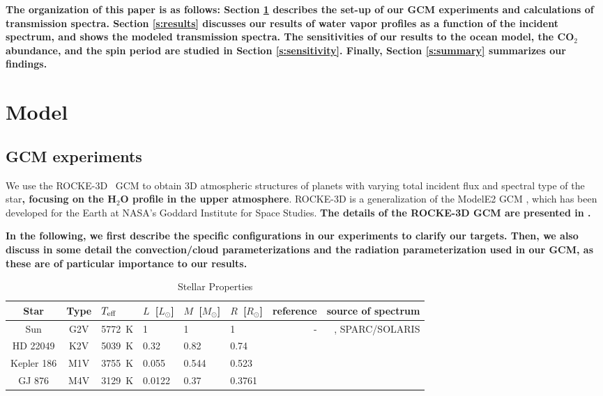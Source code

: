 \documentclass[11pt,numberedappendix,twocolappendix,]{emulateapj}
\def\water{H$_2$O}
\def\modelE{ROCKE-3D}
\def\wv{water vapor}
\def\revise#1{{\bf #1}}
\begin{document}
\revise{The organization of this paper is as follows: %
Section \ref{s:model} describes the set-up of our GCM experiments and  calculations of transmission spectra. %
Section \ref{s:results} discusses our results of \wv{} profiles as a function of the incident spectrum, and shows the modeled transmission spectra. %
The sensitivities of our results to the ocean model, the CO$_2$ abundance, and the spin period are studied in Section \ref{s:sensitivity}. %
Finally, Section \ref{s:summary} summarizes our findings. %
}

\section{Model}
\label{s:model}

\subsection{GCM experiments}

We use the \modelE{} \ GCM \citep{Way2017} to obtain 3D atmospheric structures of planets with varying total incident flux and spectral type of the star\revise{, focusing on the \water{} profile in the upper atmosphere}. 
\modelE{} is a generalization of the ModelE2 GCM \citep{Schmidt2014}, which has been developed for the Earth at NASA's Goddard Institute for Space Studies. 
\revise{The details of the ROCKE-3D GCM are presented in \citet{Way2017}.}

\revise{In the following, we first describe the specific configurations in our experiments to clarify our targets. Then, we also discuss in some detail the convection/cloud parameterizations and the radiation parameterization used in our GCM, as these are of particular importance to our results. }



\begin{table}[!btp]
\caption{Stellar Properties}
\begin{center}
\begin{tabular}{ccllllrr} \hline \hline
%
Star & Type & $T_{\rm eff}$ & $L$~[$L_{\odot}$] & $M$~[$M_{\odot}$] & $R$~[$R_{\odot}$] & reference & source of spectrum \\ \hline
%
Sun & G2V & 5772~K & 1 & 1 & 1 & - & \citet{Lean2005}, SPARC/SOLARIS\footnotemark[1] \\ 
%
HD 22049 & K2V & 5039~K & 0.32 & 0.82 & 0.74 & \citet{Baines2012} & \citet{Segura2003} \\
%
Kepler 186 & M1V & 3755~K & 0.055 & 0.544 & 0.523 & \citet{Torres2015} & \citet{Allard2012} \\
%
GJ 876 & M4V & 3129~K & 0.0122 & 0.37 & 0.3761 & \citet{vonBraun2014} & \citet{Domagal-Goldman2014} \\ \hline
\end{tabular}
\end{center}
\label{tbl:stellar_properties}
\end{table}%
\end{document}
